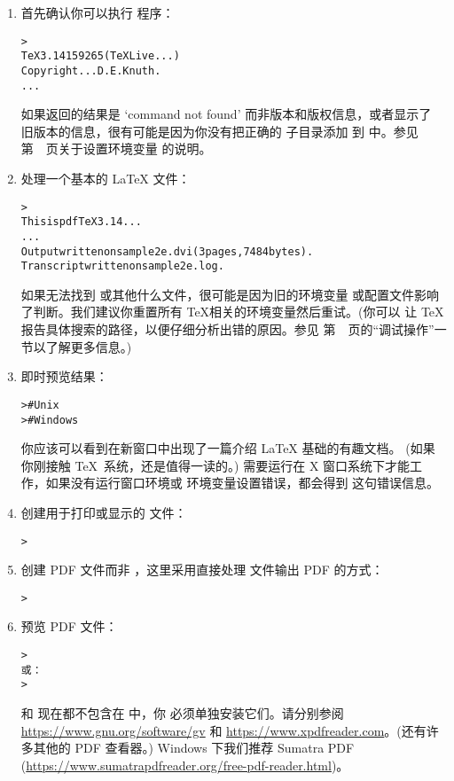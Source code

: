 \documentclass{article}
\begin{document}
\begin{enumerate}

\item 首先确认你可以执行  程序：
\begin{alltt}
> 
TeX 3.14159265 (TeX Live ...)
Copyright ... D.E. Knuth.
...
\end{alltt}
如果返回的结果是 `command not found' 而非版本和版权信息，或者显示了
旧版本的信息，很有可能是因为你没有把正确的  子目录添加
到  中。参见第~\pageref{sec:env}~页关于设置环境变量
的说明。

\item 处理一个基本的 \LaTeX{} 文件：
\begin{alltt}
> 
This is pdfTeX 3.14...
...
Output written on sample2e.dvi (3 pages, 7484 bytes).
Transcript written on sample2e.log.
\end{alltt}
如果无法找到  或其他什么文件，很可能是因为旧的环境变量
或配置文件影响了判断。我们建议你重置所有 \TeX 相关的环境变量然后重试。(你可以
让 \TeX{} 报告具体搜索的路径，以便仔细分析出错的原因。参见
第~\pageref{sec:debugging}~页的``调试操作''一节以了解更多信息。)

\item 即时预览结果：
\begin{alltt}
>     # Unix
>   # Windows
\end{alltt}
你应该可以看到在新窗口中出现了一篇介绍 \LaTeX{} 基础的有趣文档。
(如果你刚接触 \TeX\ 系统，还是值得一读的。) 
需要运行在 X 窗口系统下才能工作，如果没有运行窗口环境或
 环境变量设置错误，都会得到
 这句错误信息。

\item 创建用于打印或显示的 \PS{} 文件：
\begin{alltt}
> 
\end{alltt}

\item 创建 PDF 文件而非 \dvi{}，这里采用直接处理 
文件输出 PDF 的方式：
\begin{alltt}
> 
\end{alltt}

\item 预览 PDF 文件：
\begin{alltt}
> 
\textrm{或：}
> 
\end{alltt}
 和  现在都不包含在 \TL{} 中，你
必须单独安装它们。请分别参阅 \url{https://www.gnu.org/software/gv} 和
\url{https://www.xpdfreader.com}。(还有许多其他的 PDF 查看器。)
Windows 下我们推荐 Sumatra PDF
(\url{https://www.sumatrapdfreader.org/free-pdf-reader.html})。


\end{enumerate}
\end{document}
